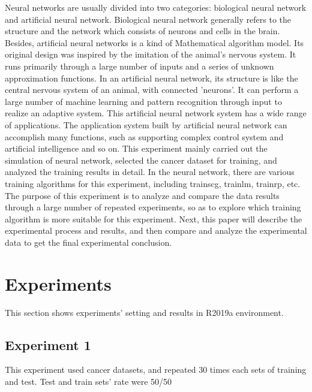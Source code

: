 \documentclass[a4paper, 12pt]{report}
\begin{document}
Neural networks are usually divided into two categories: biological neural network and
artificial neural network. Biological neural network generally refers to the structure and
the network which consists of neurons and cells in the brain. Besides, artificial neural
networks is a kind of Mathematical algorithm model. Its original design was inspired
by the imitation of the animal's nervous system. It runs primarily through a large
number of inputs and a series of unknown approximation functions. In an artificial
neural network, its structure is like the central nervous system of an animal, with
connected 'neurons'. It can perform a large number of machine learning and pattern
recognition through input to realize an adaptive system. This artificial neural network
system has a wide range of applications. The application system built by artificial neural
network can accomplish many functions, such as supporting complex control system
and artificial intelligence and so on. This experiment mainly carried out the simulation
of neural network, selected the cancer dataset for training, and analyzed the training
results in detail. In the neural network, there are various training algorithms for this
experiment, including trainscg, trainlm, trainrp, etc. The purpose of this experiment is
to analyze and compare the data results through a large number of repeated experiments,
so as to explore which training algorithm is more suitable for this experiment. Next,
this paper will describe the experimental process and results, and then compare and
analyze the experimental data to get the final experimental conclusion.

\section*{Experiments}
  This section shows experiments' setting and results in R2019a environment. 

\subsection*{Experiment 1}
This experiment used cancer datasets, and repeated 30 times each sets of training and test. Test and train sets’ rate were 50/50%
\end{document}
